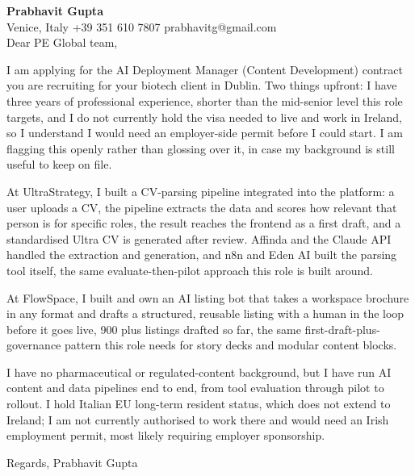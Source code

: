 \documentclass[a4paper,10.5pt]{article}
\begin{document}
\textbf{Prabhavit Gupta}\\
Venice, Italy \textbar{} +39 351 610 7807 \textbar{} prabhavitg@gmail.com\\[10pt]
Dear PE Global team,

I am applying for the AI Deployment Manager (Content Development) contract you are recruiting for your biotech client in Dublin. Two things upfront: I have three years of professional experience, shorter than the mid-senior level this role targets, and I do not currently hold the visa needed to live and work in Ireland, so I understand I would need an employer-side permit before I could start. I am flagging this openly rather than glossing over it, in case my background is still useful to keep on file.

At UltraStrategy, I built a CV-parsing pipeline integrated into the platform: a user uploads a CV, the pipeline extracts the data and scores how relevant that person is for specific roles, the result reaches the frontend as a first draft, and a standardised Ultra CV is generated after review. Affinda and the Claude API handled the extraction and generation, and n8n and Eden AI built the parsing tool itself, the same evaluate-then-pilot approach this role is built around.

At FlowSpace, I built and own an AI listing bot that takes a workspace brochure in any format and drafts a structured, reusable listing with a human in the loop before it goes live, 900 plus listings drafted so far, the same first-draft-plus-governance pattern this role needs for story decks and modular content blocks.

I have no pharmaceutical or regulated-content background, but I have run AI content and data pipelines end to end, from tool evaluation through pilot to rollout. I hold Italian EU long-term resident status, which does not extend to Ireland; I am not currently authorised to work there and would need an Irish employment permit, most likely requiring employer sponsorship.

Regards,
Prabhavit Gupta
\end{document}
